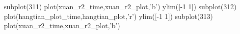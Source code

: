 subplot(311)
plot(xuan_r2_time,xuan_r2_plot,'b')
ylim([-1 1])
subplot(312)
plot(hangtian_plot_time,hangtian_plot,'r')
ylim([-1 1])
subplot(313)
plot(xuan_r2_time,xuan_r2_plot,'b')